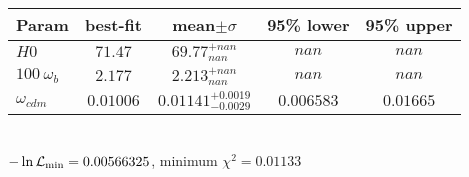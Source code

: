 \begin{tabular}{|l|c|c|c|c|} 
 \hline 
Param & best-fit & mean$\pm\sigma$ & 95\% lower & 95\% upper \\ \hline 
$H0$ &$71.47$ & $69.77_{nan}^{+nan}$ & $nan$ & $nan$ \\ 
$100~\omega_{b }$ &$2.177$ & $2.213_{nan}^{+nan}$ & $nan$ & $nan$ \\ 
$\omega_{cdm }$ &$0.01006$ & $0.01141_{-0.0029}^{+0.0019}$ & $0.006583$ & $0.01665$ \\ 
\hline 
 \end{tabular} \\ 
$-\ln{\cal L}_\mathrm{min} =0.00566325$, minimum $\chi^2=0.01133$ \\ 
